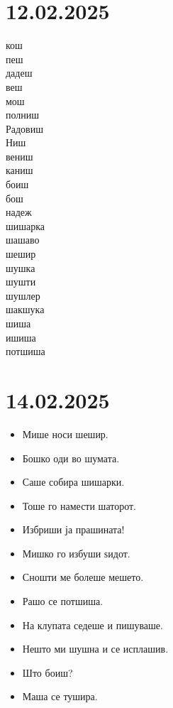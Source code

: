 \documentclass[a5paper,12pt]{article}
\newenvironment{activity}[1]{%
  \begin{tcolorbox}[colback=boxcolor,colframe=titlecolor,title={\textbf{#1}},fonttitle=\bfseries]
}{%
  \end{tcolorbox}
}
\begin{document}
\section{12.02.2025}
\begin{activity}{Зборчиња}
\begin{multicols}{4}
кош\\ пеш\\ дадеш\\ веш\\ мош\\ полниш\\ Радовиш\\ Ниш\\ вениш\\ каниш\\ боиш\\ бош\\ надеж\\ шишарка\\ шашаво\\ шешир\\ шушка\\ шушти\\ шушлер\\ шакшука\\ шиша\\ ишиша\\ потшиша
\end{multicols}
\end{activity}

\section{14.02.2025}
\begin{itemize}
  \item Мише носи шешир.
  \item Бошко оди во шумата.
  \item Саше собира шишарки.
  \item Тоше го намести шаторот.
  \item Избриши ја прашината! 
  \item Мишко го избуши ѕидот.
  \item Сношти ме болеше мешето.
  \item Рашо се потшиша.
  \item На клупата седеше и пишуваше.
  \item Нешто ми шушна и се исплашив.
  \item Што боиш? 
  \item Маша се тушира.
\end{itemize}
\end{document}
